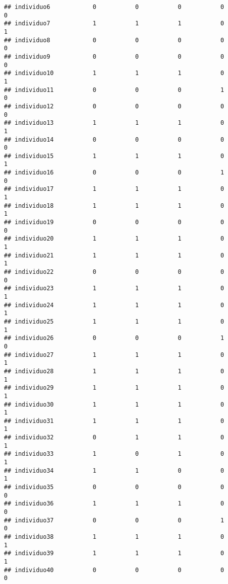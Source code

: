 \documentclass[
]{article}
\begin{document}
\begin{verbatim}
## individuo6            0           0           0           0           0
## individuo7            1           1           1           0           1
## individuo8            0           0           0           0           0
## individuo9            0           0           0           0           0
## individuo10           1           1           1           0           1
## individuo11           0           0           0           1           0
## individuo12           0           0           0           0           0
## individuo13           1           1           1           0           1
## individuo14           0           0           0           0           0
## individuo15           1           1           1           0           1
## individuo16           0           0           0           1           0
## individuo17           1           1           1           0           1
## individuo18           1           1           1           0           1
## individuo19           0           0           0           0           0
## individuo20           1           1           1           0           1
## individuo21           1           1           1           0           1
## individuo22           0           0           0           0           0
## individuo23           1           1           1           0           1
## individuo24           1           1           1           0           1
## individuo25           1           1           1           0           1
## individuo26           0           0           0           1           0
## individuo27           1           1           1           0           1
## individuo28           1           1           1           0           1
## individuo29           1           1           1           0           1
## individuo30           1           1           1           0           1
## individuo31           1           1           1           0           1
## individuo32           0           1           1           0           1
## individuo33           1           0           1           0           1
## individuo34           1           1           0           0           1
## individuo35           0           0           0           0           0
## individuo36           1           1           1           0           0
## individuo37           0           0           0           1           0
## individuo38           1           1           1           0           1
## individuo39           1           1           1           0           1
## individuo40           0           0           0           0           0

\end{verbatim}
\end{document}
